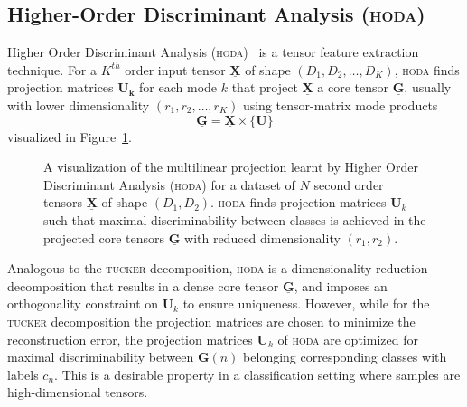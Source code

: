 \documentclass[twocolumn]{article}
\newcommand{\ten}[1]{\underline{\mathbf{#1}}} %
\newcommand{\mat}[1]{\mathbf{#1}} %
\newcommand{\mmpr}[1]{\times\{#1\}} %
\begin{document}
\subsection{Higher-Order Discriminant Analysis (\textsc{hoda})}
Higher Order Discriminant Analysis (\textsc{hoda})~\cite{Phan2010} is a tensor
feature extraction technique. For a $K^{th}$ order input tensor $\ten{X}$ of
shape $(D_1,D_2,\ldots,D_K)$, \textsc{hoda} finds projection matrices $\mat{U_k}$ for each mode $k$
that project $\ten{X}$ a core tensor $\ten{G}$, usually with lower
dimensionality $(r_1,r_2,\ldots,r_K)$ using tensor-matrix mode products
\begin{equation}
	\ten{G}  = \ten{X}\mmpr{\mat{U}}
	\label{eq:hoda-backward}
\end{equation}
visualized in Figure~\ref{fig:hoda-backward}.
\begin{figure}
	\centering
	
	\caption{A visualization of the multilinear projection learnt by Higher Order
		Discriminant Analysis (\textsc{hoda}) for a dataset of $N$ second order tensors
		$\ten{X}$ of shape $(D_1,D_2)$.
		\textsc{hoda} finds projection matrices $\mat{U}_k$ such that maximal
		discriminability between classes is achieved in the projected core tensors
		$\ten{G}$ with reduced dimensionality $(r_1,r_2)$.}
	\label{fig:hoda-backward}
\end{figure}
Analogous to the \textsc{tucker} decomposition, \textsc{hoda} is a dimensionality
reduction decomposition that results in a dense core tensor $\ten{G}$, and
imposes an orthogonality constraint on $\mat{U}_k$ to ensure uniqueness.
However, while for the \textsc{tucker} decomposition the projection matrices
are chosen to minimize the reconstruction error, the projection matrices
$\mat{U}_k$ of \textsc{hoda} are optimized for maximal discriminability between
$\ten{G}(n)$ belonging corresponding classes with labels $c_n$.
This is a desirable property in a classification setting where samples are
high-dimensional tensors.
\end{document}
